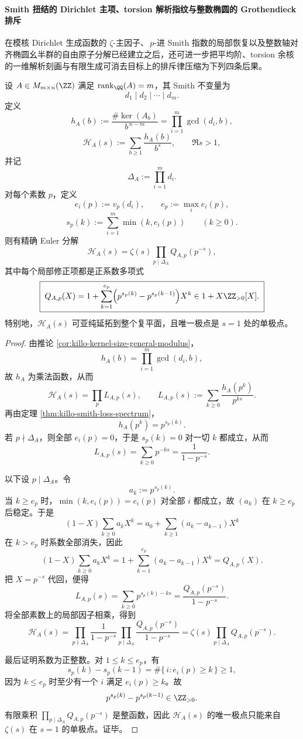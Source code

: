 \paragraph{Smith 扭结的 Dirichlet 主项、torsion 解析指纹与整数椭圆的 Grothendieck 排斥}
在模核 Dirichlet 生成函数的 \(\zeta\)-主因子、\(\,p\)-进 Smith 指数的局部恢复以及整数轴对齐椭圆幺半群的自由原子分解已经建立之后，还可进一步把平均阶、torsion 余核的一维解析刻画与有限生成可消去目标上的排斥律压缩为下列四条后果。

\begin{theorem}\label{thm:xi-smith-normalized-kernel-positive-finite-euler-correction}
设 \(A\in M_{m\times n}(\ZZ)\) 满足 \(\operatorname{rank}_{\QQ}(A)=m\)，其 Smith 不变量为
\[
d_1\mid d_2\mid \cdots \mid d_m.
\]
定义
\[
h_A(b):=\frac{\#\ker(A_b)}{b^{\,n-m}}
=
\prod_{i=1}^{m}\gcd(d_i,b),
\]
\[
\mathcal H_A(s):=\sum_{b\ge 1}\frac{h_A(b)}{b^s},
\qquad \Re s>1,
\]
并记
\[
\Delta_A:=\prod_{i=1}^{m}d_i.
\]
对每个素数 \(p\)，定义
\[
e_i(p):=v_p(d_i),\qquad
e_p:=\max_i e_i(p),
\]
\[
s_p(k):=\sum_{i=1}^{m}\min(k,e_i(p))
\qquad (k\ge 0).
\]
则有精确 Euler 分解
\[
\boxed{\;
\mathcal H_A(s)
=
\zeta(s)\prod_{p\mid \Delta_A}Q_{A,p}(p^{-s}),
\;}
\]
其中每个局部修正项都是正系数多项式
\[
\boxed{\;
Q_{A,p}(X)
=
1+\sum_{k=1}^{e_p}
\Bigl(p^{s_p(k)}-p^{s_p(k-1)}\Bigr)X^k
\in 1+X\ZZ_{>0}[X].\;}
\]
特别地，\(\mathcal H_A(s)\) 可亚纯延拓到整个复平面，且唯一极点是 \(s=1\) 处的单极点。
\end{theorem}
\begin{proof}
由推论 \ref{cor:killo-kernel-size-general-modulus}，
\[
h_A(b)=\prod_{i=1}^{m}\gcd(d_i,b),
\]
故 \(h_A\) 为乘法函数，从而
\[
\mathcal H_A(s)=\prod_p L_{A,p}(s),
\qquad
L_{A,p}(s):=\sum_{k\ge 0}\frac{h_A(p^k)}{p^{ks}}.
\]
再由定理 \ref{thm:killo-smith-loss-spectrum}，
\[
h_A(p^k)=p^{s_p(k)}.
\]
若 \(p\nmid \Delta_A\)，则全部 \(e_i(p)=0\)，于是 \(s_p(k)=0\) 对一切 \(k\) 都成立，从而
\[
L_{A,p}(s)=\sum_{k\ge 0}p^{-ks}=\frac{1}{1-p^{-s}}.
\]

以下设 \(p\mid \Delta_A\)。令
\[
a_k:=p^{s_p(k)}.
\]
当 \(k\ge e_p\) 时，\(\min(k,e_i(p))=e_i(p)\) 对全部 \(i\) 都成立，故 \((a_k)\) 在 \(k\ge e_p\) 后稳定。于是
\[
(1-X)\sum_{k\ge 0}a_kX^k
=
a_0+\sum_{k\ge 1}(a_k-a_{k-1})X^k
\]
在 \(k>e_p\) 时系数全部消失，因此
\[
(1-X)\sum_{k\ge 0}a_kX^k
=
1+\sum_{k=1}^{e_p}(a_k-a_{k-1})X^k
=
Q_{A,p}(X).
\]
把 \(X=p^{-s}\) 代回，便得
\[
L_{A,p}(s)
=
\sum_{k\ge 0}p^{s_p(k)-ks}
=
\frac{Q_{A,p}(p^{-s})}{1-p^{-s}}.
\]
将全部素数上的局部因子相乘，得到
\[
\mathcal H_A(s)
=
\prod_{p\nmid \Delta_A}\frac{1}{1-p^{-s}}
\prod_{p\mid \Delta_A}\frac{Q_{A,p}(p^{-s})}{1-p^{-s}}
=
\zeta(s)\prod_{p\mid \Delta_A}Q_{A,p}(p^{-s}).
\]

最后证明系数为正整数。对 \(1\le k\le e_p\)，有
\[
s_p(k)-s_p(k-1)=\#\{\,i:e_i(p)\ge k\,\}\ge 1,
\]
因为 \(k\le e_p\) 时至少有一个 \(i\) 满足 \(e_i(p)\ge k\)。故
\[
p^{s_p(k)}-p^{s_p(k-1)}\in \ZZ_{>0}.
\]
有限乘积 \(\prod_{p\mid \Delta_A}Q_{A,p}(p^{-s})\) 是整函数，因此 \(\mathcal H_A(s)\) 的唯一极点只能来自 \(\zeta(s)\) 在 \(s=1\) 的单极点。证毕。
\end{proof}

